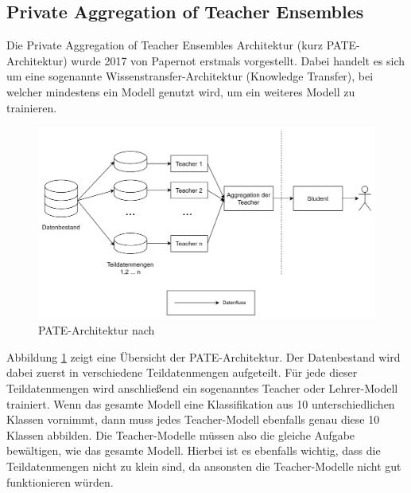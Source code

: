 \subsection{Private Aggregation of Teacher Ensembles}\label{sec:pate}

Die Private Aggregation of Teacher Ensembles Architektur (kurz PATE-Architektur) wurde 2017 von Papernot \etal \cite{P-57} erstmals vorgestellt.
Dabei handelt es sich um eine sogenannte Wissenstransfer-Architektur (Knowledge Transfer), bei welcher mindestens ein Modell genutzt wird, um ein weiteres Modell zu trainieren.

\begin{figure}[!htb]
    \centering
    \includegraphics[width=\textwidth]{figures/pate_basic.png}
    \caption{PATE-Architektur nach \cite{P-57}}
    \label{fig:pate_basic}
\end{figure} 

Abbildung \ref{fig:pate_basic} zeigt eine Übersicht der PATE-Architektur.
Der Datenbestand wird dabei zuerst in verschiedene Teildatenmengen aufgeteilt. 
Für jede dieser Teildatenmengen wird anschließend ein sogenanntes Teacher oder Lehrer-Modell trainiert.
Wenn das gesamte Modell eine Klassifikation aus 10 unterschiedlichen Klassen vornimmt, dann muss jedes Teacher-Modell ebenfalls genau diese 10 Klassen abbilden.
Die Teacher-Modelle müssen also die gleiche Aufgabe bewältigen, wie das gesamte Modell.
Hierbei ist es ebenfalls wichtig, dass die Teildatenmengen nicht zu klein sind, da ansonsten die Teacher-Modelle nicht gut funktionieren würden.


